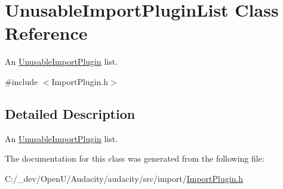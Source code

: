 \hypertarget{class_unusable_import_plugin_list}{}\section{Unusable\+Import\+Plugin\+List Class Reference}
\label{class_unusable_import_plugin_list}


An \hyperlink{class_unusable_import_plugin}{Unusable\+Import\+Plugin} list.  




{\ttfamily \#include $<$Import\+Plugin.\+h$>$}



\subsection{Detailed Description}
An \hyperlink{class_unusable_import_plugin}{Unusable\+Import\+Plugin} list. 

The documentation for this class was generated from the following file\+:\begin{DoxyCompactItemize}
\item 
C\+:/\+\_\+dev/\+Open\+U/\+Audacity/audacity/src/import/\hyperlink{_import_plugin_8h}{Import\+Plugin.\+h}\end{DoxyCompactItemize}
